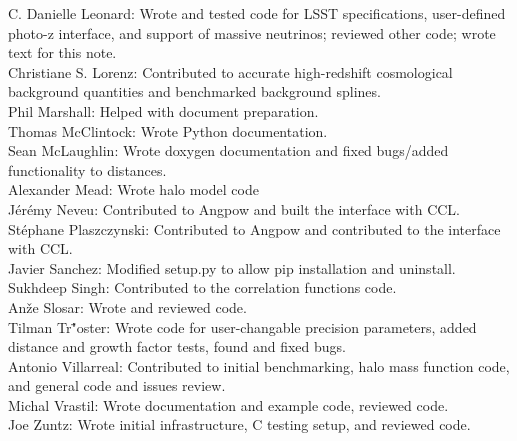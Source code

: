 C. Danielle Leonard: Wrote and tested code for LSST specifications, user-defined photo-z interface, and support of massive neutrinos; reviewed other code; wrote text for this note. \\
Christiane S. Lorenz: Contributed to accurate high-redshift cosmological background quantities and benchmarked background splines. \\
Phil Marshall: Helped with document preparation. \\
Thomas McClintock: Wrote Python documentation. \\
Sean McLaughlin: Wrote doxygen documentation and fixed bugs/added functionality to distances. \\
Alexander Mead: Wrote halo model code \\
J\'er\'emy Neveu: Contributed to Angpow and built the interface with CCL. \\
St\'ephane Plaszczynski: Contributed to Angpow and contributed to the interface with CCL. \\
Javier Sanchez: Modified setup.py to allow pip installation and uninstall. \\
Sukhdeep Singh: Contributed to the correlation functions code. \\
An\v{z}e Slosar: Wrote and reviewed code. \\
Tilman Tr\""oster: Wrote code for user-changable precision parameters, added distance and growth factor tests, found and fixed bugs. \\
Antonio Villarreal: Contributed to initial benchmarking, halo mass function code, and general code and issues review. \\
Michal Vrastil: Wrote documentation and example code, reviewed code. \\
Joe Zuntz: Wrote initial infrastructure, C testing setup, and reviewed code. \\

